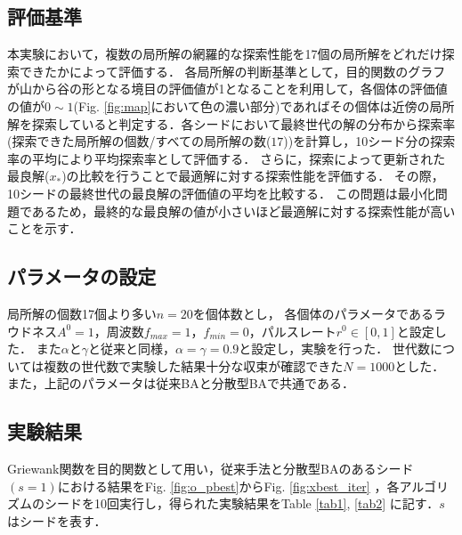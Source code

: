 \documentclass{jarticle}
\begin{document}
\subsection{評価基準}
本実験において，複数の局所解の網羅的な探索性能を17個の局所解をどれだけ探索できたかによって評価する．
各局所解の判断基準として，目的関数のグラフが山から谷の形となる境目の評価値が1となることを利用して，各個体の評価値の値が${0\sim 1}$(Fig. \ref{fig:map}において色の濃い部分)であればその個体は近傍の局所解を探索していると判定する．各シードにおいて最終世代の解の分布から探索率(探索できた局所解の個数/すべての局所解の数($17$))を計算し，10シード分の探索率の平均により平均探索率として評価する．
さらに，探索によって更新された最良解($x_*$)の比較を行うことで最適解に対する探索性能を評価する．
その際，10シードの最終世代の最良解の評価値の平均を比較する．
この問題は最小化問題であるため，最終的な最良解の値が小さいほど最適解に対する探索性能が高いことを示す．

\subsection{パラメータの設定}
局所解の個数17個より多い${n=20}$を個体数とし，
各個体のパラメータであるラウドネス${A^0=1}$，周波数${f_{max}=1，f_{min} =0}$，パルスレート$r^0 \in [0,1]$と設定した．
また${\alpha}$と${\gamma}$と従来と同様，${\alpha = \gamma = 0.9}$と設定し，実験を行った．
世代数については複数の世代数で実験した結果十分な収束が確認できた${N=1000}$とした．
また，上記のパラメータは従来BAと分散型BAで共通である．

\subsection{実験結果}
Griewank関数を目的関数として用い，従来手法と分散型BAのあるシード${(s=1)}$における結果をFig. \ref{fig:o_pbest}からFig. \ref{fig:xbest_iter} ，各アルゴリズムのシードを10回実行し，得られた実験結果をTable \ref{tab1}, \ref{tab2} に記す．${s}$はシードを表す．
\end{document}
